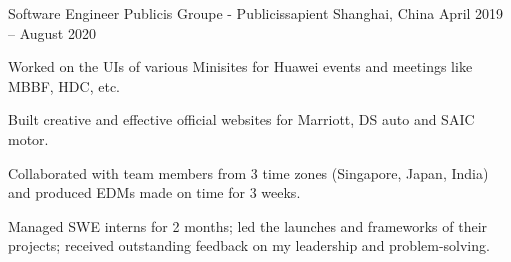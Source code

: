 \begin{cventries}
  \cventry
    {Software Engineer} %
    {Publicis Groupe - Publicissapient} %
    {Shanghai, China} %
    {April 2019 -- August 2020} %
    {
      \begin{cvitems} %
        \item{Worked on the UIs of various Minisites for Huawei events and meetings like MBBF, HDC, etc.}
        \item{Built creative and effective official websites for Marriott, DS auto and SAIC motor.}
        \item{Collaborated with team members from 3 time zones (Singapore, Japan, India) and produced EDMs made on time for 3 weeks.}
        \item{Managed SWE interns for 2 months; led the launches and frameworks of their projects; received outstanding feedback on my leadership and problem-solving.}
      \end{cvitems}
    }

\end{cventries}

